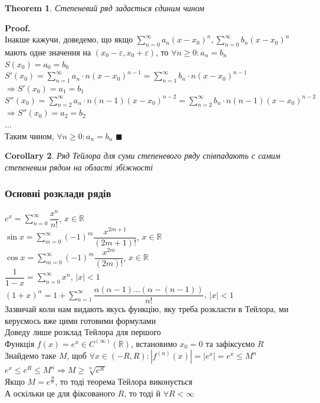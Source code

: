 \documentclass[a4paper, 14pt]{extarticle}
\def\huge{\displaystyle}
\def\bigline{\vspace{5mm}\\}
\theoremstyle{theoremdd}
\newtheorem{theorem}{Theorem}[subsection]
\theoremstyle{theoremdd}
\theoremstyle{theoremdd}
\theoremstyle{theoremdd}
\theoremstyle{theoremdd}
\theoremstyle{theoremdd}
\theoremstyle{theoremdd}
\theoremstyle{theoremdd}
\newtheorem{corollary}[theorem]{Corollary}
\newenvironment{pf}{\vspace*{-3mm} \textbf{Proof. \\}}{$\blacksquare$}
\begin{document}
\begin{theorem}
Степеневий ряд задається єдиним чином
\end{theorem}

\begin{pf}
Інакше кажучи, доведемо, що якщо $\huge \sum_{n=0}^\infty a_n(x-x_0)^n, \sum_{n=0}^\infty b_n(x-x_0)^n$ мають одне значення на $(x_0-\varepsilon, x_0+\varepsilon)$, то $\forall n \geq 0: a_n = b_n$\\
$S(x_0) = a_0 = b_0$\\
$S'(x_0) = \huge \sum_{n=1}^\infty a_n \cdot n(x-x_0)^{n-1} = \sum_{n=1}^\infty b_n \cdot n(x-x_0)^{n-1}$\\
$\Rightarrow S'(x_0) = a_1 = b_1$\\
$S''(x_0) = \huge\sum_{n=2}^\infty a_n \cdot n (n-1) (x-x_0)^{n-2} = \sum_{n=2}^\infty b_n \cdot n (n-1) (x-x_0)^{n-2}$\\
$\Rightarrow S''(x_0) = a_2 = b_2$\\
$\dots$\\
Таким чином, $\forall n \geq 0: a_n = b_n$
\end{pf}

\begin{corollary}
Ряд Тейлора для суми степеневого ряду співпадають с самим степеневим рядом на області збіжності
\end{corollary}

\subsubsection*{Основні розклади рядів}
$e^x = \huge\sum_{n=0}^\infty \dfrac{x^n}{n!}$, $x \in \mathbb{R}$\\
$\sin x = \huge\sum_{m=0}^\infty (-1)^m \dfrac{x^{2m+1}}{(2m+1)!}$, $x \in \mathbb{R}$\\
$\cos x = \huge\sum_{m=0}^\infty (-1)^m \dfrac{x^{2m}}{(2m)!}$, $x \in \mathbb{R}$\\
$\dfrac{1}{1-x} = \huge\sum_{n=0}^\infty x^n$, $|x| < 1$\\
$(1+x)^{\alpha} = 1 + \huge\sum_{n=1}^\infty \dfrac{\alpha(\alpha-1)\dots (\alpha- (n-1))}{n!}$, $|x| < 1$\\
Зазвичай коли нам видають якусь функцію, яку треба розкласти в Тейлора, ми керуємось вже цими готовими формулами
\bigline
Доведу лише розклад Тейлора для першого\\
Функція $f(x) = e^x \in C^{(\infty)} (\mathbb{R})$, встановимо $x_0 = 0$ та зафіксуємо $R$\\
Знайдемо таке $M$, щоб $\forall x \in (-R,R): |f^{(n)}(x)| = |e^x| = e^x \leq M^n$\\
$e^x \leq e^R \leq M^n \Rightarrow M \geq \sqrt[n]{e^R}$\\
Якщо $M = e^{\frac{R}{n}}$, то тоді теорема Тейлора виконується\\
А оскільки це для фіксованого $R$, то тоді й $\forall R < \infty$
\end{document}
